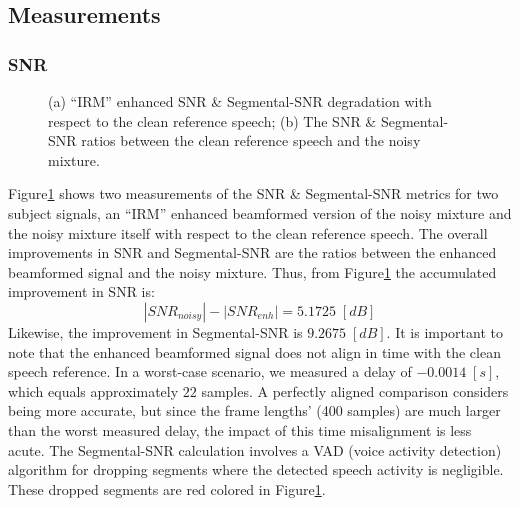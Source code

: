 \subsection{Measurements}
\subsubsection{SNR}
\begin{figure}[H]
    \centering
    \caption{(a) ``IRM'' enhanced SNR \& Segmental-SNR degradation
        with respect to the clean reference speech;\;\;
        (b) The SNR \& Segmental-SNR ratios between the
        clean reference speech and the noisy mixture.}\label{fig:irm_enh_noisy_snr} 
\end{figure}

Figure\;\ref{fig:irm_enh_noisy_snr} shows two measurements of the SNR \&
Segmental-SNR metrics for two subject signals, 
an ``IRM'' enhanced beamformed
version of the noisy mixture and the noisy mixture itself
with respect to the clean reference speech.
The overall improvements in SNR and Segmental-SNR 
are the ratios between the enhanced beamformed signal
and the noisy mixture. Thus, from Figure\;\ref{fig:irm_enh_noisy_snr}
the accumulated improvement in SNR is:
\[|SNR_{noisy}| - |SNR_{enh}| = 5.1725\;[dB]\]
Likewise, the improvement in Segmental-SNR is \(9.2675\;[dB]\).
It is important to note that the enhanced beamformed signal
does not align in time with the clean speech reference. 
In a worst-case scenario, we measured a delay of \(-0.0014\;[s]\),
which equals approximately \(22\) samples. 
A perfectly aligned comparison considers being more 
accurate, but since the frame lengths' (400 samples)
are much larger than the worst measured delay, 
the impact of this time misalignment is less acute.
The Segmental-SNR calculation involves 
a VAD (voice activity detection) algorithm
for dropping segments where the detected speech activity is negligible.
These dropped segments are red colored in Figure\;\ref{fig:irm_enh_noisy_snr}.

